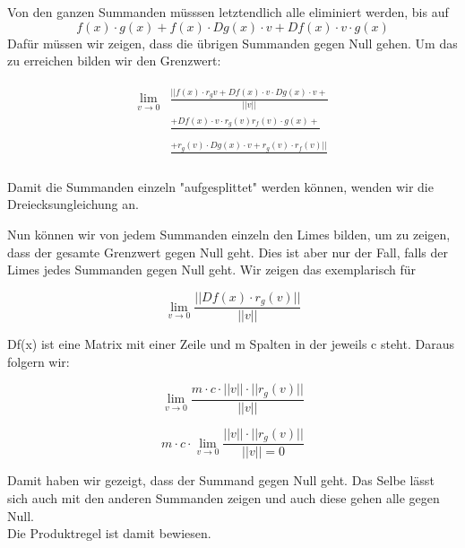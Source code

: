 Von den ganzen Summanden müsssen letztendlich alle eliminiert werden, bis auf 
\begin{equation*} f(x) \cdot g(x) + f(x) \cdot Dg(x) \cdot v + Df(x) \cdot v \cdot g(x) \end{equation*} 
Dafür müssen wir zeigen, dass die übrigen Summanden gegen Null gehen. Um das zu erreichen bilden wir den Grenzwert:

\begin{align}
\begin{split}
\lim \limits_{v \rightarrow 0} &\frac{||f(x) \cdot r_{g}v + Df(x) \cdot v \cdot Dg(x) \cdot v +}{||v||}\\
&\frac{+ Df(x) \cdot v \cdot r_{g}(v) r_{f}(v) \cdot g(x) +}{}\\
&\frac{+ r_{g}(v) \cdot Dg(x) \cdot v + r_{g}(v) \cdot r_{f}(v)||}{}
\end{split}
\end{align}

Damit die Summanden einzeln "aufgesplittet" werden können, wenden wir die Dreiecksungleichung %
an.

Nun können wir von jedem Summanden einzeln den Limes bilden, um zu zeigen, dass der gesamte Grenzwert gegen Null geht. Dies ist aber nur der Fall, falls der Limes jedes Summanden gegen Null geht. Wir zeigen das exemplarisch für 

\begin{equation*}
\lim\limits_{v \rightarrow 0} \frac{||Df(x) \cdot r_{g}(v)||}{||v||}
\end{equation*}

Df(x) ist eine Matrix mit einer Zeile und m Spalten in der jeweils c steht. Daraus folgern wir:

\begin{equation*}
\lim\limits_{v \rightarrow 0} \frac{m \cdot c \cdot ||v|| \cdot ||r_{g}(v)||}{||v||}
\end{equation*}

\begin{equation*}
m \cdot c \cdot \lim\limits_{v \rightarrow 0} \frac{ ||v|| \cdot ||r_{g}(v)||}{||v|| = 0}
\end{equation*} 

Damit haben wir gezeigt, dass der Summand gegen Null geht. Das Selbe lässt sich auch mit den anderen Summanden zeigen und auch diese gehen alle gegen Null. \\
Die Produktregel ist damit bewiesen. 













